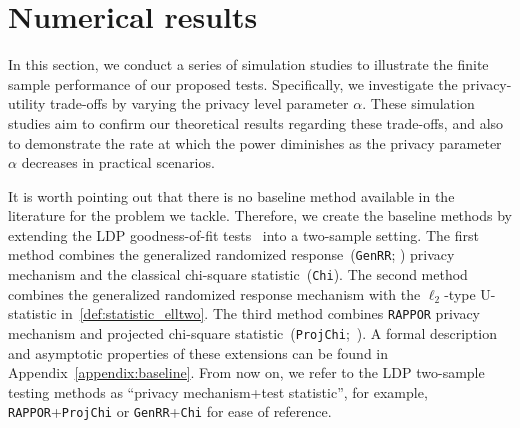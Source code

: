 \documentclass[twoside,11pt]{article}
\newcommand{\privacyParameter}{\alpha} %
\begin{document}











\section{Numerical results}\label{section:simulation}
In this section, we conduct a series of simulation studies to illustrate the finite sample performance of our proposed tests. Specifically, we investigate the privacy-utility trade-offs by varying the privacy level parameter $\privacyParameter$. These simulation studies aim to confirm our theoretical results regarding these trade-offs, and also to demonstrate the rate at which the power diminishes as the privacy parameter $\privacyParameter$ decreases in practical scenarios. 


It is worth pointing out that there is no baseline method available in the literature for the problem we tackle.
Therefore, we create the baseline methods by extending the LDP goodness-of-fit tests~\citep{Gaboardi2018LDPChisq} into a two-sample setting.
The first method combines the generalized randomized response~(\texttt{GenRR}; \citep{Gaboardi2018LDPChisq}) privacy mechanism and the classical chi-square statistic~(\texttt{Chi}).
The second method combines the generalized randomized response mechanism with the $\ell_2$-type U-statistic in~\eqref{def:statistic_elltwo}.
The third method combines \texttt{RAPPOR} privacy mechanism and projected chi-square statistic~(\texttt{ProjChi};~\citep{Gaboardi2018LDPChisq}).
A formal description and asymptotic properties of these extensions can be found in Appendix~\ref{appendix:baseline}.
From now on, we refer to the LDP two-sample testing methods as ``privacy mechanism+test statistic'', for example, \texttt{RAPPOR}+\texttt{ProjChi} or \texttt{GenRR}+\texttt{Chi} for ease of reference.
\end{document}
